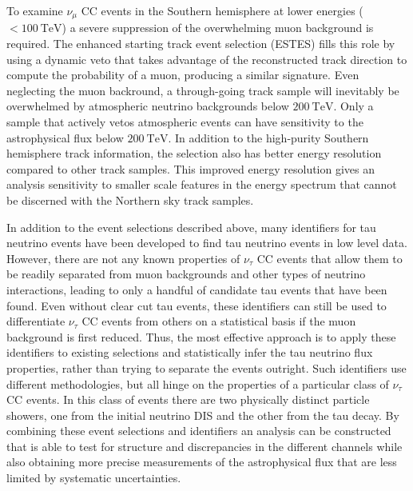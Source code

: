 To examine $\nu_\mu$ CC events in the Southern hemisphere at lower energies ($<\SI{100}\TeV$) a severe suppression of the overwhelming muon background is required.
The enhanced starting track event selection (ESTES) fills this role by using a dynamic veto that takes advantage of the reconstructed track direction to compute the probability of a muon, producing a similar signature.
Even neglecting the muon backround, a through-going track sample will inevitably be overwhelmed by atmospheric neutrino backgrounds below $\SI{200}\TeV$.
Only a sample that actively vetos atmospheric events can have sensitivity to the astrophysical flux below $\SI{200}\TeV$.
In addition to the high-purity Southern hemisphere track information, the selection also has better energy resolution compared to other track samples.
This improved energy resolution gives an analysis sensitivity to smaller scale features in the energy spectrum that cannot be discerned with the Northern sky track samples.

In addition to the event selections described above, many identifiers for tau neutrino events have been developed to find tau neutrino events in low level data.
However, there are not any known properties of $\nu_\tau$ CC events that allow them to be readily separated from muon backgrounds and other types of neutrino interactions, leading to only a handful of candidate tau events that have been found.
Even without clear cut tau events, these identifiers can still be used to differentiate $\nu_\tau$ CC events from others on a statistical basis if the muon background is first reduced.
Thus, the most effective approach is to apply these identifiers to existing selections and statistically infer the tau neutrino flux properties, rather than trying to separate the events outright.
Such identifiers use different methodologies, but all hinge on the properties of a particular class of $\nu_\tau$ CC events.
In this class of events there are two physically distinct particle showers, one from the initial neutrino DIS and the other from the tau decay.
By combining these event selections and identifiers an analysis can be constructed that is able to test for structure and discrepancies in the different channels while also obtaining more precise measurements of the astrophysical flux that are less limited by systematic uncertainties.

